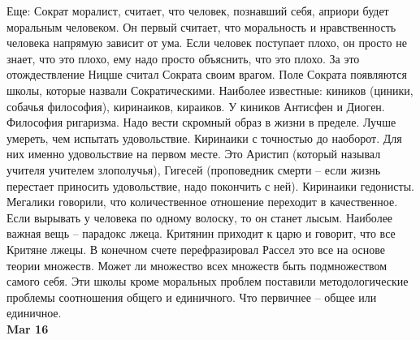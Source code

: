 \documentclass[a4paper, 12pt]{article}
\begin{document}
Еще: Сократ моралист, считает, что человек, познавший себя, априори будет моральным человеком. Он первый считает, что моральность и нравственность человека напрямую зависит от ума. Если человек поступает плохо, он просто не знает, что это плохо, ему надо просто объяснить, что это плохо. За это отождествление Ницше считал Сократа своим врагом. Поле Сократа появляются школы, которые назвали Сократическими. Наиболее известные: киников (циники, собачья философия), киринаиков, кираиков. У киников Антисфен и Диоген. Философия ригаризма. Надо вести скромный образ в жизни в пределе. Лучше умереть, чем испытать удовольствие. Киринаики с точностью до наоборот. Для них именно удовольствие на первом месте. Это Аристип (который называл учителя учителем злополучья), Гигесей (проповедник смерти -- если жизнь перестает приносить удовольствие, надо покончить с ней). Киринаики гедонисты. Мегалики говорили, что количественное отношение переходит в качественное. Если вырывать у человека по одному волоску, то он станет лысым. Наиболее важная вещь -- парадокс лжеца. Критянин приходит к царю и говорит, что все Критяне лжецы. В конечном счете перефразировал Рассел это все на основе теории множеств. Может ли множество всех множеств быть подмножеством самого себя. Эти школы кроме моральных проблем поставили методологические проблемы соотношения общего и единичного. Что первичнее -- общее или единичное. 
\\

\hfill \textbf{Mar 16}
\end{document}
